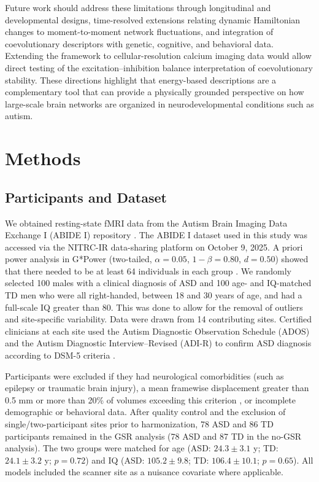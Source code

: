 \documentclass[10pt,letterpaper]{article}
\begin{document}
Future work should address these limitations through longitudinal and developmental designs,
time-resolved extensions relating dynamic Hamiltonian changes to moment-to-moment network
fluctuations, and integration of coevolutionary descriptors with genetic, cognitive, and behavioral
data. Extending the framework to cellular-resolution calcium imaging data would allow direct
testing of the excitation--inhibition balance interpretation of coevolutionary stability. These
directions highlight that energy-based descriptions are a complementary tool that can provide a
physically grounded perspective on how large-scale brain networks are organized in neurodevelopmental
conditions such as autism.

\section*{Methods}

\subsection*{Participants and Dataset}
We obtained resting-state fMRI data from the Autism Brain Imaging Data Exchange I (ABIDE I)
repository \cite{DiMartino:2014abide}. The ABIDE I dataset used in this study was accessed via the NITRC-IR 
data-sharing platform on October 9, 2025. A priori power analysis in G*Power (two-tailed, $\alpha=0.05$,
$1-\beta=0.80$, $d=0.50$) showed that there needed to be at least 64 individuals in each group
\cite{Faul2009}. We randomly selected 100 males with a clinical diagnosis of ASD and 100 age- and
IQ-matched TD men who were all right-handed, between 18 and 30 years of age, and had a full-scale
IQ greater than 80. This was done to allow for the removal of outliers and site-specific variability.
Data were drawn from 14 contributing sites. Certified clinicians at each site used the Autism
Diagnostic Observation Schedule (ADOS) and the Autism Diagnostic Interview--Revised (ADI-R) to
confirm ASD diagnosis according to DSM-5 criteria \cite{APA:2022ds}.



Participants were excluded if they had neurological comorbidities (such as epilepsy or traumatic
brain injury), a mean framewise displacement greater than 0.5 mm or more than 20\% of volumes
exceeding this criterion \cite{Faul2009}, or incomplete demographic or behavioral data. After
quality control and the exclusion of single/two-participant sites prior to harmonization, 78 ASD
and 86 TD participants remained in the GSR analysis (78 ASD and 87 TD in the no-GSR analysis). The
two groups were matched for age
(ASD: $24.3\pm3.1$ y; TD: $24.1\pm3.2$ y; $p=0.72$) and IQ (ASD: $105.2\pm9.8$; TD:
$106.4\pm10.1$; $p=0.65$). All models included the scanner site as a nuisance covariate where
applicable.
\end{document}
